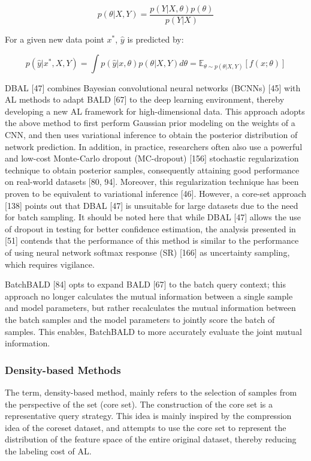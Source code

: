 \begin{equation}
p(\theta | X,Y) = \frac{p(Y|X,\theta)p(\theta)}{p(Y|X)} 
\end{equation}

For a given new data point $x^{\ast}$, $\hat{y}$ is predicted by:

\begin{equation}
p (\hat{y}|x^\ast, X , Y ) = \int p(\hat{y}| x, \theta) p(\theta|X,Y)d\theta = \mathbb{E}_{\theta \sim p(\theta|X,Y)}[f(x;\theta)]
\end{equation}

DBAL [47] combines Bayesian convolutional neural networks (BCNNs) [45] with AL methods to
adapt BALD [67] to the deep learning environment, thereby developing a new AL framework for
high-dimensional data. This approach adopts the above method to first perform Gaussian prior
modeling on the weights of a CNN, and then uses variational inference to obtain the posterior
distribution of network prediction. In addition, in practice, researchers often also use a powerful
and low-cost Monte-Carlo dropout (MC-dropout) [156] stochastic regularization technique to
obtain posterior samples, consequently attaining good performance on real-world datasets [80, 94].
Moreover, this regularization technique has been proven to be equivalent to variational inference
[46]. However, a core-set approach [138] points out that DBAL [47] is unsuitable for large datasets
due to the need for batch sampling. It should be noted here that while DBAL [47] allows the use of
dropout in testing for better confidence estimation, the analysis presented in [51] contends that the
performance of this method is similar to the performance of using neural network softmax response
(SR) [166] as uncertainty sampling, which requires vigilance. 

BatchBALD [84] opts to expand BALD [67] to the batch query
context; this approach no longer calculates the mutual information between a single sample and
model parameters, but rather recalculates the mutual information between the batch samples and
the model parameters to jointly score the batch of samples. This enables, BatchBALD to more
accurately evaluate the joint mutual information.

\subsubsection{ Density-based Methods}
The term, density-based method, mainly refers to the selection of samples from the perspective of the set (core set). The construction of the core set is a representative query strategy. This idea is mainly inspired by the compression idea of the coreset dataset, and attempts to use the core set to represent the distribution of the feature space of the entire original dataset, thereby reducing the labeling cost of AL.

